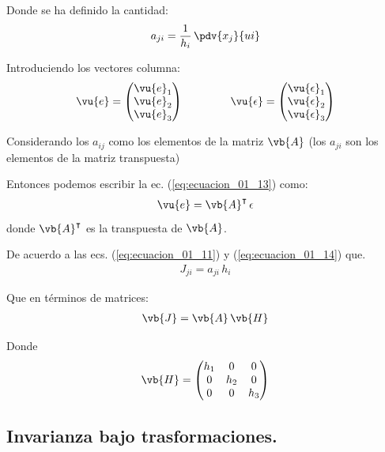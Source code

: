 Donde se ha definido la cantidad:
\begin{align}
a_{ji} = \dfrac{1}{h_{i}} \, \pdv{x_{j}}{u{i}}
\label{eq:ecuacion_01_14}
\end{align}

Introduciendo los vectores columna:
\begin{align*}
\vu{e} =
\begin{pmatrix}
\vu{e}_{1} \\
\vu{e}_{2} \\
\vu{e}_{3} \\
\end{pmatrix}
\hspace{1.5cm}
\vu{\epsilon} =
\begin{pmatrix}
\vu{\epsilon}_{1} \\
\vu{\epsilon}_{2} \\
\vu{\epsilon}_{3} \\
\end{pmatrix}
\end{align*}
 
Considerando los $a_{ij}$ como los elementos de la matriz $\vb{A}$ (los $a_{ji}$ son los elementos de la matriz transpuesta)
\par
Entonces podemos escribir la ec. (\ref{eq:ecuacion_01_13}) como:
\begin{align}
\vu{e} = \vb{A}^{\intercal} \, \epsilon
\end{align}
donde $\vb{A}^{\intercal}$ es la transpuesta de $\vb{A}$.
\par
De acuerdo a las ecs. (\ref{eq:ecuacion_01_11}) y (\ref{eq:ecuacion_01_14}) que.
\begin{align*}
J_{ji} = a_{ji} \, h_{i}
\end{align*}
\par
Que en términos de matrices:
\begin{align}
\vb{J} = \vb{A} \, \vb{H}
\label{eq:ecuacion_01_16}
\end{align}
\par
Donde
\begin{align}
\vb{H} = \begin{pmatrix}
h_{1} & 0 & 0 \\
0 & h_{2} & 0 \\
0 & 0 & h_{3} \\
\end{pmatrix}
\label{eq:ecuacion_01_17}
\end{align}

\subsection{Invarianza bajo trasformaciones.}

